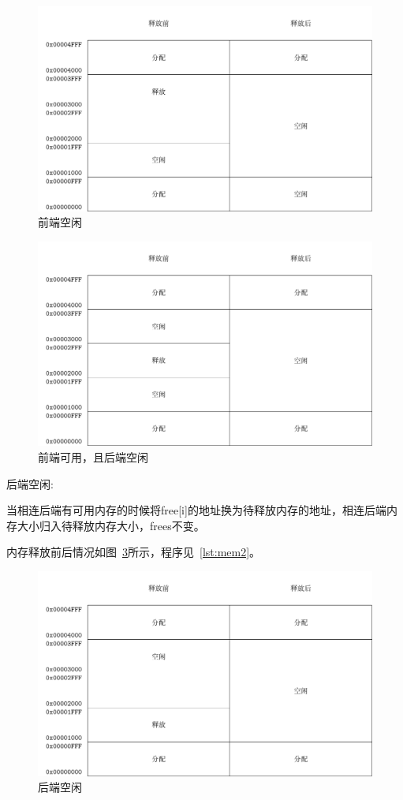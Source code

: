 \begin{figure}[h]
  \centering
  \includegraphics[width=.7\textwidth]{fig/mem0.pdf}
  \caption{前端空闲}
  \label{fig:mem0}
\end{figure}

\begin{figure}[h]
  \centering
  \includegraphics[width=.7\textwidth]{fig/mem1.pdf}
  \caption{前端可用，且后端空闲}
  \label{fig:mem1}
\end{figure}


\newpage
后端空闲:

当相连后端有可用内存的时候将free[i]的地址换为待释放内存的地址，相连后端内存大小归入待释放内存大小，frees不变。

内存释放前后情况如图~\ref{fig:mem2}所示，程序见~\ref{lst:mem2}。

\begin{figure}[h]
  \centering
  \includegraphics[width=.7\textwidth]{fig/mem2.pdf}
  \caption{后端空闲}
  \label{fig:mem2}
\end{figure}

